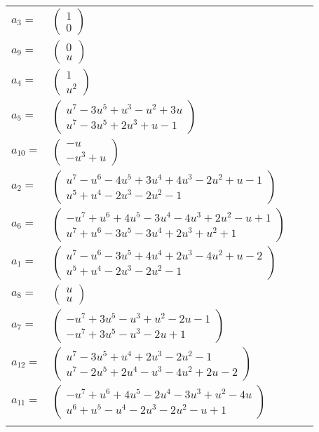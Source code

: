 \documentclass[1p]{elsarticle_modified}
\theoremstyle{definition}
\begin{document}
\begin{tabular}{m{7pt} m{180pt} m{7pt} m{180pt} }
\flushright $a_{3}=$&$\begin{pmatrix}1\\0\end{pmatrix}$ \\
\flushright $a_{9}=$&$\begin{pmatrix}0\\u\end{pmatrix}$ \\
\flushright $a_{4}=$&$\begin{pmatrix}1\\u^2\end{pmatrix}$ \\
\flushright $a_{5}=$&$\begin{pmatrix}u^7-3 u^5+u^3- u^2+3 u\\u^7-3 u^5+2 u^3+u-1\end{pmatrix}$ \\
\flushright $a_{10}=$&$\begin{pmatrix}- u\\- u^3+u\end{pmatrix}$ \\
\flushright $a_{2}=$&$\begin{pmatrix}u^7- u^6-4 u^5+3 u^4+4 u^3-2 u^2+u-1\\u^5+u^4-2 u^3-2 u^2-1\end{pmatrix}$ \\
\flushright $a_{6}=$&$\begin{pmatrix}- u^7+u^6+4 u^5-3 u^4-4 u^3+2 u^2- u+1\\u^7+u^6-3 u^5-3 u^4+2 u^3+u^2+1\end{pmatrix}$ \\
\flushright $a_{1}=$&$\begin{pmatrix}u^7- u^6-3 u^5+4 u^4+2 u^3-4 u^2+u-2\\u^5+u^4-2 u^3-2 u^2-1\end{pmatrix}$ \\
\flushright $a_{8}=$&$\begin{pmatrix}u\\u\end{pmatrix}$ \\
\flushright $a_{7}=$&$\begin{pmatrix}- u^7+3 u^5- u^3+u^2-2 u-1\\- u^7+3 u^5- u^3-2 u+1\end{pmatrix}$ \\
\flushright $a_{12}=$&$\begin{pmatrix}u^7-3 u^5+u^4+2 u^3-2 u^2-1\\u^7-2 u^5+2 u^4- u^3-4 u^2+2 u-2\end{pmatrix}$ \\
\flushright $a_{11}=$&$\begin{pmatrix}- u^7+u^6+4 u^5-2 u^4-3 u^3+u^2-4 u\\u^6+u^5- u^4-2 u^3-2 u^2- u+1\end{pmatrix}$\\&\end{tabular}
\end{document}
